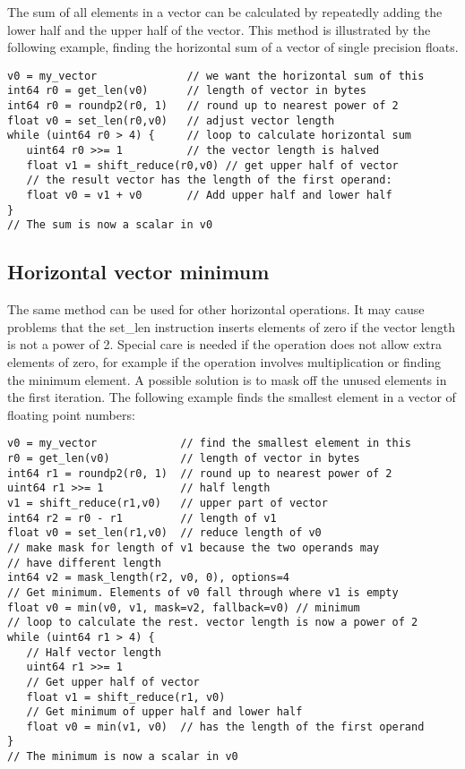 \documentclass[forwardcom.tex]{subfiles}
\begin{document}
The sum of all elements in a vector can be calculated by repeatedly adding the lower half and the upper half of the vector. This method is illustrated by the following example, finding the horizontal sum of a vector of single precision floats. 

\begin{example}
\label{exampleHorizontalAdd}
\end{example} %
\begin{lstlisting}[frame=single]
v0 = my_vector              // we want the horizontal sum of this
int64 r0 = get_len(v0)      // length of vector in bytes
int64 r0 = roundp2(r0, 1)   // round up to nearest power of 2
float v0 = set_len(r0,v0)   // adjust vector length
while (uint64 r0 > 4) {     // loop to calculate horizontal sum
   uint64 r0 >>= 1          // the vector length is halved
   float v1 = shift_reduce(r0,v0) // get upper half of vector
   // the result vector has the length of the first operand:
   float v0 = v1 + v0       // Add upper half and lower half
}
// The sum is now a scalar in v0
\end{lstlisting}
\vspace{4mm}


\subsection{Horizontal vector minimum} \label{horizontalVectorMin}
The same method can be used for other horizontal operations. It may cause problems that the set\_len instruction inserts elements of zero if the vector length is not a power of 2. Special care is needed if the operation does not allow extra elements of zero, for example if the operation involves multiplication or finding the minimum element. A possible solution is to mask off the unused elements in the first iteration. The following example finds the smallest element in a vector of floating point numbers:

\begin{example}
\label{exampleHorizontalMin}
\end{example}
\begin{lstlisting}[frame=single]
v0 = my_vector             // find the smallest element in this
r0 = get_len(v0)           // length of vector in bytes
int64 r1 = roundp2(r0, 1)  // round up to nearest power of 2
uint64 r1 >>= 1            // half length
v1 = shift_reduce(r1,v0)   // upper part of vector
int64 r2 = r0 - r1         // length of v1
float v0 = set_len(r1,v0)  // reduce length of v0
// make mask for length of v1 because the two operands may 
// have different length
int64 v2 = mask_length(r2, v0, 0), options=4
// Get minimum. Elements of v0 fall through where v1 is empty
float v0 = min(v0, v1, mask=v2, fallback=v0) // minimum
// loop to calculate the rest. vector length is now a power of 2
while (uint64 r1 > 4) {
   // Half vector length
   uint64 r1 >>= 1
   // Get upper half of vector
   float v1 = shift_reduce(r1, v0)
   // Get minimum of upper half and lower half
   float v0 = min(v1, v0)  // has the length of the first operand
}
// The minimum is now a scalar in v0
\end{lstlisting}
\vspace{4mm}
\end{document}
